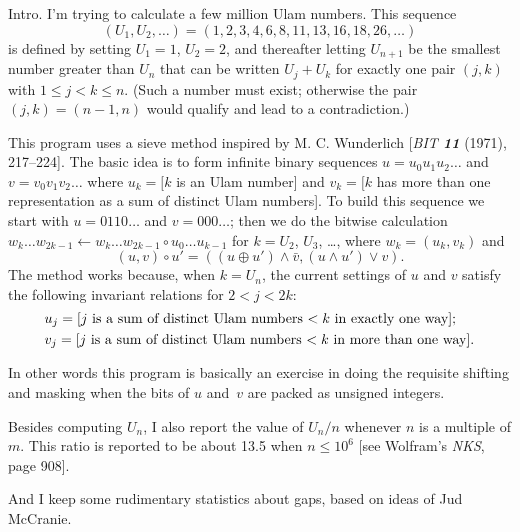 
\datethis

Intro. I'm trying to calculate a few million Ulam numbers.
This sequence
$$(U_1,U_2,\ldots{})=(1,2,3,4,6,8,11,13,16,18,26,\ldots{})$$
is defined by setting $U_1=1$, $U_2=2$, and thereafter letting
$U_{n+1}$ be the smallest number greater than $U_n$ that can be
written $U_j+U_k$ for exactly one pair $(j,k)$ with $1\le j<k\le n$.
(Such a number must exist; otherwise the pair $(j,k)=(n-1,n)$ would
qualify and lead to a contradiction.)

This program uses a sieve method inspired by M. C. Wunderlich
[{\sl BIT\/ \bf11} (1971), 217--224]. The basic idea is to
form infinite binary sequences $u=u_0u_1u_2\ldots{}$ and $v=v_0v_1v_2\ldots{}$
where $u_k=[k$ is an Ulam number] and $v_k=[k$ has more than one
representation as a sum of distinct Ulam numbers].
To build this sequence we start with $u=0110\ldots{}$ and $v=000\ldots{}$;
then we do the bitwise calculation
$w_k\ldots w_{2k-1}\gets w_k\ldots w_{2k-1}\circ u_0\ldots u_{k-1}$
for $k=U_2$, $U_3$, \dots, where $w_k=(u_k,v_k)$ and
$$(u,v)\circ u'=((u\oplus u')\wedge\bar v,(u\wedge u')\vee v).$$
The method works because,
when $k=U_n$, the current settings of $u$ and $v$ satisfy the
following invariant relations for $2<j<2k$:
$$\vcenter{\halign{#\hfil\cr
$u_j=[j$ is a sum of distinct Ulam numbers $<k$ in exactly one way];\cr
\noalign{\smallskip}
$v_j=[j$ is a sum of distinct Ulam numbers $<k$ in more than one way].\cr}}$$

In other words this program is basically an exercise in doing the requisite
shifting and masking when the bits of $u$ and~$v$ are packed as unsigned
integers.

Besides computing $U_n$, I also report the value of $U_n/n$ whenever
$n$ is a multiple of $m$. This ratio is reported to be about 13.5 when
$n\le 10^6$ [see Wolfram's {\sl NKS}, page 908].

And I keep some rudimentary statistics about gaps, based on ideas
of Jud McCranie.

